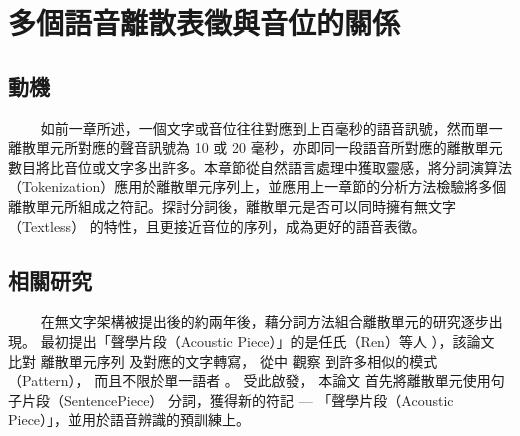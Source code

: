 \chapter{多個語音離散表徵與音位的關係}
\newcommand{\myhline}{\noindent\makebox[\linewidth]{\rule{\paperwidth}{0.4pt}}}

\newcommand{\draftbegin}{\centerline{\textcolor{magenta}{\textbf{=======================以下是草稿！=======================}}}}
\newcommand{\drafttermi}{\centerline{\textcolor{blue}{\textbf{=======================以上是草稿！=======================}}}}

\renewcommand{\arraystretch}{0.7} %
\newcommand{\jefftablesep}{\vspace{0.5cm}}


\section{動機}
　　
如前一章所述，一個文字或音位往往對應到上百毫秒的語音訊號，然而單一離散單元所對應的聲音訊號為 10 或 20 毫秒，亦即同一段語音所對應的離散單元數目將比音位或文字多出許多。本章節從自然語言處理中獲取靈感，將分詞演算法（Tokenization）應用於離散單元序列上，並應用上一章節的分析方法檢驗將多個離散單元所組成之符記。探討分詞後，離散單元是否可以同時擁有無文字（Textless）\cite{lakhotia_generative_2021, lakhotia_generative_2021-1, noauthor_textless_2021} 的特性，且更接近音位的序列，成為更好的語音表徵。
% 　　

\section{相關研究} 
　　
在無文字架構被提出後的約兩年後，藉分詞方法組合離散單元的研究逐步出現。
最初提出「聲學片段（Acoustic Piece）」的是任氏（Ren）等人 \cite{ren_speech_2022}），該論文
比對
離散單元序列
及對應的文字轉寫，
從中
觀察
到許多相似的模式（Pattern），
而且不限於單一語者
。
受此啟發，
本論文
首先將離散單元使用句子片段（SentencePiece） \cite{kudo_sentencepiece_2018} 分詞，獲得新的符記 --- 「聲學片段（Acoustic Piece）」，並用於語音辨識的預訓練上。

